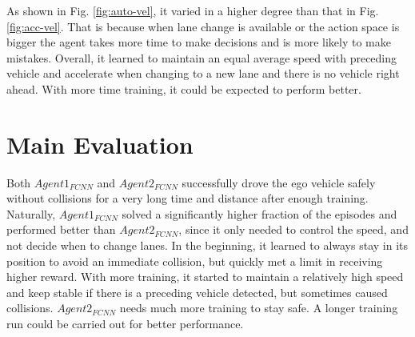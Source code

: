 As shown in Fig. \ref{fig:auto-vel}, it varied in a higher degree than that in Fig. \ref{fig:acc-vel}. That is because when lane change is available or the action space is bigger the agent takes more time to make decisions and is more likely to make mistakes. Overall, it learned to maintain an equal average speed with preceding vehicle and accelerate when changing to a new lane and there is no vehicle right ahead. With more time training, it could be expected to perform better.

\section{Main Evaluation}

Both $Agent1_{FCNN}$ and $Agent2_{FCNN}$ successfully drove the ego vehicle safely without collisions for a very long time and distance after enough training. Naturally, $Agent1_{FCNN}$ solved a significantly higher fraction of the episodes and performed better than $Agent2_{FCNN}$, since it only needed to control the speed, and not decide when to change lanes. In the beginning, it learned to always stay in its position to avoid an immediate collision, but quickly met a limit in receiving higher reward. With more training, it started to maintain a relatively high speed and keep stable if there is a preceding vehicle detected, but sometimes caused collisions. $Agent2_{FCNN}$ needs much more training to stay safe. A longer training run could be carried out for better performance.

